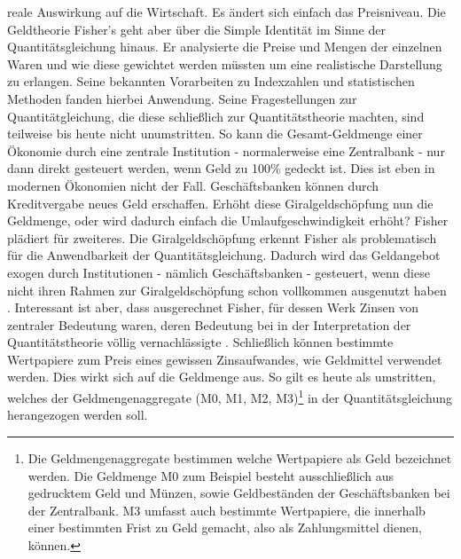 reale Auswirkung auf die Wirtschaft. Es ändert sich einfach das Preisniveau. Die Geldtheorie Fisher's geht aber über die Simple Identität im Sinne der Quantitätsgleichung hinaus. Er analysierte die Preise und Mengen der einzelnen Waren und wie diese gewichtet werden müssten um eine realistische Darstellung zu erlangen. Seine bekannten Vorarbeiten zu Indexzahlen und statistischen Methoden fanden hierbei Anwendung. Seine Fragestellungen zur Quantitätgleichung, die diese schließlich zur Quantitätstheorie machten, sind teilweise bis heute nicht unumstritten. So kann die Gesamt-Geldmenge einer Ökonomie durch eine zentrale Institution - normalerweise eine Zentralbank - nur dann direkt gesteuert werden, wenn Geld zu 100\% gedeckt ist. Dies ist eben in modernen Ökonomien nicht der Fall. Geschäftsbanken können durch Kreditvergabe neues Geld erschaffen. Erhöht diese Giralgeldschöpfung nun die Geldmenge, oder wird dadurch einfach die Umlaufgeschwindigkeit erhöht? Fisher plädiert für zweiteres. Die Giralgeldschöpfung erkennt Fisher als problematisch für die Anwendbarkeit der Quantitätsgleichung. Dadurch wird das Geldangebot exogen durch Institutionen - nämlich Geschäftsbanken - gesteuert, wenn diese nicht ihren Rahmen zur Giralgeldschöpfung schon vollkommen ausgenutzt haben \parencite[S. 35]{Tobin1985}. Interessant ist aber, dass ausgerechnet Fisher, für dessen Werk Zinsen \parencite{Fisher1906, Fisher1930} von zentraler Bedeutung waren, deren Bedeutung bei in der Interpretation der Quantitätstheorie völlig vernachlässigte \parencite{Tobin2005}. Schließlich können bestimmte Wertpapiere zum Preis eines gewissen Zinsaufwandes, wie Geldmittel verwendet werden. Dies wirkt sich auf die Geldmenge aus. So gilt es heute als umstritten, welches der Geldmengenaggregate (M0, M1, M2, M3)\footnote{Die Geldmengenaggregate bestimmen welche Wertpapiere als Geld bezeichnet werden. Die Geldmenge M0 zum Beispiel besteht ausschließlich aus gedrucktem Geld und Münzen, sowie Geldbeständen der Geschäftsbanken bei der Zentralbank. M3 umfasst auch bestimmte Wertpapiere, die innerhalb einer bestimmten Frist zu Geld gemacht, also als Zahlungsmittel dienen, können.} in der Quantitätsgleichung herangezogen werden soll. 
